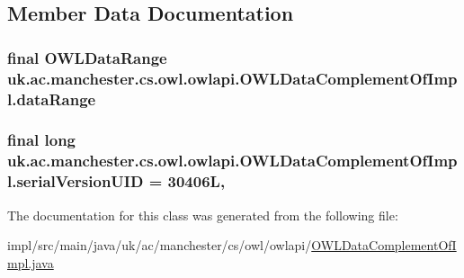 \subsection{Member Data Documentation}
\hypertarget{classuk_1_1ac_1_1manchester_1_1cs_1_1owl_1_1owlapi_1_1_o_w_l_data_complement_of_impl_abf47ed02b4b05d4398a6db311346bd21}{
\subsubsection[{data\-Range}]{\setlength{\rightskip}{0pt plus 5cm}final {\bf O\-W\-L\-Data\-Range} uk.\-ac.\-manchester.\-cs.\-owl.\-owlapi.\-O\-W\-L\-Data\-Complement\-Of\-Impl.\-data\-Range\hspace{0.3cm}{\ttfamily [private]}}}\label{classuk_1_1ac_1_1manchester_1_1cs_1_1owl_1_1owlapi_1_1_o_w_l_data_complement_of_impl_abf47ed02b4b05d4398a6db311346bd21}
\hypertarget{classuk_1_1ac_1_1manchester_1_1cs_1_1owl_1_1owlapi_1_1_o_w_l_data_complement_of_impl_ade73de083c3e9457b115d5b88d479f86}{
\subsubsection[{serial\-Version\-U\-I\-D}]{\setlength{\rightskip}{0pt plus 5cm}final long uk.\-ac.\-manchester.\-cs.\-owl.\-owlapi.\-O\-W\-L\-Data\-Complement\-Of\-Impl.\-serial\-Version\-U\-I\-D = 30406\-L\hspace{0.3cm}{\ttfamily [static]}, {\ttfamily [private]}}}\label{classuk_1_1ac_1_1manchester_1_1cs_1_1owl_1_1owlapi_1_1_o_w_l_data_complement_of_impl_ade73de083c3e9457b115d5b88d479f86}


The documentation for this class was generated from the following file\-:\begin{DoxyCompactItemize}
\item 
impl/src/main/java/uk/ac/manchester/cs/owl/owlapi/\hyperlink{_o_w_l_data_complement_of_impl_8java}{O\-W\-L\-Data\-Complement\-Of\-Impl.\-java}\end{DoxyCompactItemize}
